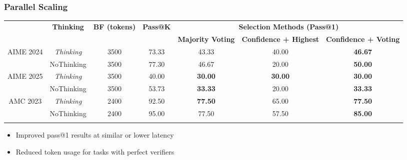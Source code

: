 \documentclass[student, noshadow, lsr, english, aspectratio=169]{ITR_LSR_slides}
\begin{document}
\begin{frame}
	\frametitle{Parallel Scaling}
	\centering
	\begin{adjustbox}{width=\textwidth, max totalheight=0.85\textheight}
		\begin{tabular}{ccccccc}
			\Xhline{1pt}
			\multirow{2}{*}{\textbf{Task}} & \multirow{2}{*}{\textbf{Thinking}} & \multirow{2}{*}{\textbf{BF (tokens)}} & \multirow{2}{*}{\textbf{Pass@K}} & \multicolumn{3}{c}{\textbf{Selection Methods (Pass@1)}} \\
            \cline{5-7}
            & & & & \textbf{Majority Voting} & \textbf{Confidence + Highest} & \textbf{Confidence + Voting} \\ \hline
			\multirow{2}{*}{AIME 2024} & \textit{Thinking} & 3500 & 73.33 & 43.33 & 40.00 & \textbf{46.67} \\
			& NoThinking & 3500 & 77.30 & 46.67 & 20.00 & \textbf{50.00} \\ \hline
			\multirow{2}{*}{AIME 2025} & \textit{Thinking} & 3500 & 40.00 & \textbf{30.00} & \textbf{30.00} & \textbf{30.00} \\
			& NoThinking & 3500 & 53.73 & \textbf{33.33} & 20.00 & \textbf{33.33} \\ \hline
			\multirow{2}{*}{AMC 2023} & \textit{Thinking} & 2400 & 92.50 & \textbf{77.50} & 65.00 & \textbf{77.50} \\
			& NoThinking & 2400 & 95.00 & 77.50 & 57.50 & \textbf{85.00} \\
			\Xhline{1pt}
		\end{tabular}
	\end{adjustbox}
	\vspace{4pt}
	\begin{itemize}
		\item Improved pass@1 results at similar or lower latency
		\item Reduced token usage for tasks with perfect verifiers
	\end{itemize}
\end{frame}

\end{document}

